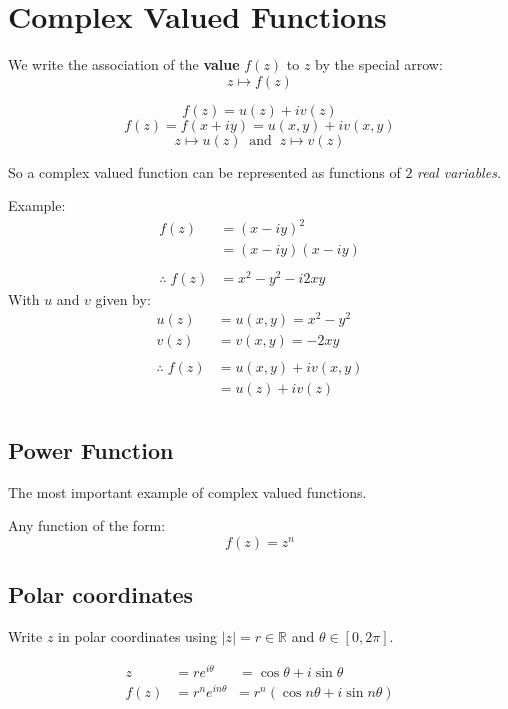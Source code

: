\section{Complex Valued Functions}
We write the association of the \textbf{value} $f(z)$ to $z$ by the special arrow:
\[z \mapsto f(z) \]

\begin{defn}
	\[f(z) = u(z) +iv(z)\]
	\[f(z) = f(x + iy) = u(x,y) + iv(x,y)\]
	\[z \mapsto u(z) \;\; \text{and} \;\;  z \mapsto v(z) \]
\end{defn}

So a complex valued function can be represented as functions of $2$ \textit{real variables.}

Example:
\begin{align*}
	f(z) &= (x - iy)^2 \\
	&= (x - iy)(x - iy) \\
	\\
	\therefore \; f(z) &= x^2 - y^2 - i2xy
\end{align*}
With $u$ and $v$ given by:
\begin{align*}
	u(z) &= u(x, y) = x^2 - y^2 \\
	v(z) &= v(x, y) = -2xy \\
	\\
	\therefore \; f(z) &= u(x, y) + iv(x, y) \\
	&= u(z) + iv(z) \\
\end{align*}

\subsection{Power Function}
The most important example of complex valued functions.
\begin{defn}
Any function of the form:
	\[f(z) = z^n\]
\end{defn}

\subsection{Polar coordinates}
Write $z$ in polar coordinates using $|z| = r \in \mathbb{R}$ and $\theta \in [0, 2\pi]$.

\begin{defn}
	\begin{align*}
		z &= re^{i\theta} \;\;\;\;\;\; = \cos{\theta} + i\sin{\theta} \\
		f(z) &= r^ne^{in\theta} \;\; = r^n(\cos{n\theta} + i\sin{n\theta}) \\
	\end{align*}
\end{defn}


